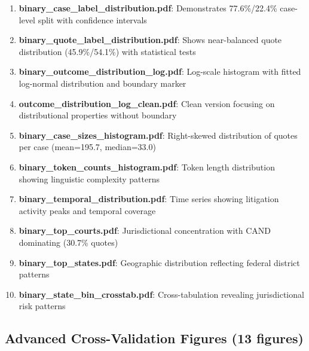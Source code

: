 \documentclass[11pt,a4paper]{article}
\begin{document}
\begin{enumerate}
\item \textbf{binary\_case\_label\_distribution.pdf}: Demonstrates 77.6\%/22.4\% case-level split with confidence intervals
\item \textbf{binary\_quote\_label\_distribution.pdf}: Shows near-balanced quote distribution (45.9\%/54.1\%) with statistical tests
\item \textbf{binary\_outcome\_distribution\_log.pdf}: Log-scale histogram with fitted log-normal distribution and boundary marker
\item \textbf{outcome\_distribution\_log\_clean.pdf}: Clean version focusing on distributional properties without boundary
\item \textbf{binary\_case\_sizes\_histogram.pdf}: Right-skewed distribution of quotes per case (mean=195.7, median=33.0)
\item \textbf{binary\_token\_counts\_histogram.pdf}: Token length distribution showing linguistic complexity patterns
\item \textbf{binary\_temporal\_distribution.pdf}: Time series showing litigation activity peaks and temporal coverage
\item \textbf{binary\_top\_courts.pdf}: Jurisdictional concentration with CAND dominating (30.7\% quotes)
\item \textbf{binary\_top\_states.pdf}: Geographic distribution reflecting federal district patterns
\item \textbf{binary\_state\_bin\_crosstab.pdf}: Cross-tabulation revealing jurisdictional risk patterns
\end{enumerate}

\subsection{Advanced Cross-Validation Figures (13 figures)}
\end{document}

